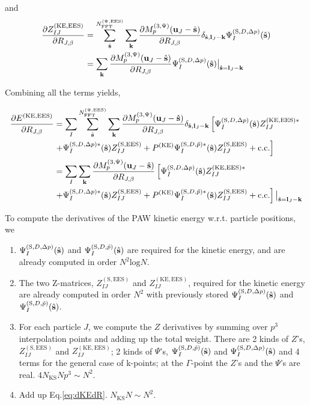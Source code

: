 \documentclass[paper=a4, fontsize=11pt]{article} %
\numberwithin{equation}{section} %
\numberwithin{figure}{section} %
\numberwithin{table}{section} %
\newcommand{\p}{\partial}
\newcommand{\bu}{{\bf{u}}}
\newcommand{\bl}{{\bf{l}}}
\newcommand{\bk}{{\bf{k}}}
\newcommand{\bs}{{\bf{s}}}
\newcommand{\hs}{{\hat{\bf{s}}}}
\newcommand{\rS}{{\mathrm{S}}}
\newcommand{\rKE}{{\mathrm{KE}}}
\newcommand{\rEES}{{\mathrm{EES}}}
\newcommand{\rcc}{{\mathrm{c.c.}}}
\newcommand{\rl}{{\mathrm{log}}}
\newcommand{\RJb}{{R_{J,\beta}}}
\newcommand{\NKS}{{N_{\mathrm{KS}}}}
\newcommand{\NFFTpEES}{{N^{\mathrm{(\Psi,\rEES})}_{\mathrm{FFT}}}}
\newcommand{\Mp}{{M_p^{(3,\Psi)}}}
\begin{document}
and
\begin{equation}\label{eq:dZKEdR}
\begin{split}
\frac{\p Z_{IJ}^{(\rKE,\rEES)}}{\p \RJb}
&= \sum_{\hat \bs}^{\NFFTpEES}  \sum_{\bk} \frac{\p \Mp(\bu_{J}-\hat \bs)}{\p \RJb}\delta_{\hat \bs,\bl_J-\bk} \Psi_I^{(\rS,D,\Delta p)}(\hs) \\
&= \sum_{\bk} \frac{\p \Mp(\bu_{J}-\hat \bs)}{\p \RJb}\Psi_I^{(\rS,D,\Delta p)}(\hs)\big|_{\hat \bs=\bl_J-\bk} \\
\end{split}
\end{equation}

Combining all the terms yields,

\begin{equation}\label{eq:dKEdR}
\begin{split}
\frac{\p E^{(\rKE,\rEES)}}{ \p \RJb}
&= \sum_I \sum_{\hat \bs}^{\NFFTpEES}  \sum_{\bk} \frac{\p \Mp(\bu_{J}-\hat \bs)}{\p \RJb}\delta_{\hat \bs,\bl_J-\bk} \left[\Psi_I^{(\rS,D,\Delta p)}(\hs)Z_{IJ}^{(\rKE,\rEES)*} \right. \\ &\left. + \Psi_I^{(\rS,D,\Delta p)*}(\hs)Z_{IJ}^{(\rS,\rEES)} + P^{(\rKE)}\Psi_I^{(\rS,D,\tilde p)*}(\hat \bs)Z_{IJ}^{(\rS,\rEES)} + \rcc \right]\\
&= \sum_I \sum_{\bk} \frac{\p \Mp(\bu_{J}-\hat \bs)}{\p \RJb} \left[\Psi_I^{(\rS,D,\Delta p)}(\hs)Z_{IJ}^{(\rKE,\rEES)*} \right. \\ &\left. + \Psi_I^{(\rS,D,\Delta p)*}(\hs)Z_{IJ}^{(\rS,\rEES)} + P^{(\rKE)}\Psi_I^{(\rS,D,\tilde p)*}(\hat \bs)Z_{IJ}^{(\rS,\rEES)} + \rcc \right] \big|_{\hat \bs=\bl_J-\bk}
\end{split}
\end{equation}

 

To compute the derivatives of the PAW kinetic energy w.r.t. particle positions, we 

\begin{enumerate}
\item $\Psi_I^{(\rS,D,\Delta p)}(\hs)$ and $\Psi_I^{(\rS,D,\tilde p)}(\hs)$ are required for the kinetic energy, and are already computed in order $N^2 \rl N$.
\item The two Z-matrices, $Z_{IJ}^{(\rS,\rEES)}$ and $Z_{IJ}^{(\rKE,\rEES)}$, required for the kinetic energy are already computed in order $N^2$ with previously stored $\Psi_I^{(\rS,D,\Delta p)}(\hs)$ and $\Psi_I^{(\rS,D,\tilde p)}(\hs)$.
\item For each particle $J$, we compute the $Z$ derivatives by summing over $p^3$ interpolation points and adding up the total weight. There are 2 kinds of $Z$'s, $Z_{IJ}^{(\rS,\rEES)}$ and $Z_{IJ}^{(\rKE,\rEES)}$; 2 kinds of $\Psi$'s, $\Psi_I^{(\rS,D,\tilde p)}(\hs)$ and $\Psi_I^{(\rS,D,\Delta p)}(\hs)$ and 4 terms for the general case of k-points; at the $\Gamma$-point the $Z$'s and the $\Psi$'s are real.
$4\NKS N p^3 \sim N^2$.
\item Add up Eq.\eqref{eq:dKEdR}. $\NKS N \sim N^2$.
\end{enumerate}
\end{document}
